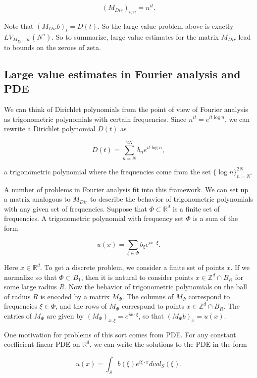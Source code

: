 \documentclass{amsart}
\newcommand{\ZZ}{\mathbb{Z}}
\newcommand{\RR}{\mathbb{R}}
\begin{document}
$$(M_{Dir})_{t,n} = n^{it}. $$

Note that $(M_{Dir} b)_t = D(t)$.  So the large value problem above is exactly $LV_{M_{Dir}, \infty}(N^\sigma)$.  So to summarize,  large value estimates for the matrix $M_{Dir}$ lead to bounds on the zeroes of zeta.



\subsection{Large value estimates in Fourier analysis and PDE}

We can think of Dirichlet polynomials from the point of view of Fourier analysis as trigonometric polynomials with certain frequencies.   Since $n^{it} = e^{i t \log n}$,  we can rewrite a Dirichlet polynomial $D(t)$ as

$$ D(t) = \sum_{n = N}^{2N} b_n e^{i t \log n}, $$

\noindent a trigonometric polynomial where the frequencies come from the set $\{ \log n \}_{n=N}^{2N}$.  

A number of problems in Fourier analysis fit into this framework.   We can set up a matrix analogous to $M_{Dir}$ to describe the behavior of trigonometric polynomials with any given set of frequencies.  Suppose that $\Phi \subset \RR^d$ is a finite set of frequencies.  A trigonometric polynomial with frequency set $\Phi$ is a sum of the form 

$$u(x) = \sum_{\xi \in \Phi} b_{\xi} e^{ i x \cdot \xi}. $$

Here $x \in \RR^d$.   To get a discrete problem,  we consider a finite set of points $x$.   If we normalize so that $\Phi \subset B_1$,  then it is natural to consider points $x \in \ZZ^d \cap B_R$ for some large radius $R$.   Now the behavior of trigonometric polynomials on the ball of radius $R$ is encoded by a matrix $M_\Phi$.   The columns of $M_\Phi$ correspond to frequencies $\xi \in \Phi$,  and the rows of $M_\Phi$ correspond to points $x \in \ZZ^d \cap B_R$.   The entries of $M_\Phi$ are given by $(M_\Phi)_{x, \xi} = e^{i x \cdot \xi}$,  so that $(M_\Phi b)_x = u(x)$. 

One motivation for problems of this sort comes from PDE.   For any constant coefficient linear PDE on $\RR^d$,  we can write the solutions to the PDE in the form

\begin{equation} \label{fourrep} u(x) =  \int_{S} b(\xi) e^{i \xi \cdot x} d vol_S(\xi). \end{equation}
\end{document}

